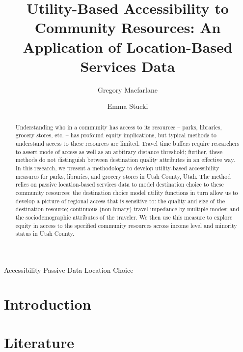 \documentclass[3p, authoryear]{elsarticle} %
\begin{document}
\begin{frontmatter}

  \title{Utility-Based Accessibility to Community Resources: An Application of Location-Based Services Data}
    \author[BYU]{Gregory Macfarlane}
    \author[BYU]{Emma Stucki}
      \address[BYU]{Brigham Young University Civil and Construction Engineering Department, 430 Engineering Building, Provo, Utah 84602}
    \address[Another University]{Some Other Place}
  
  \begin{abstract}
  Understanding who in a community has access to its resources -- parks, libraries, grocery stores, etc. -- has profound equity implications, but typical methods to understand access to these resources are limited. Travel time buffers require researchers to assert mode of access as well as an arbitrary distance threshold; further, these methods do not distinguish between destination quality attributes in an effective way. In this research, we present a methodology to develop utility-based accessibility measures for parks, libraries, and grocery stores in Utah County, Utah. The method relies on passive location-based services data to model destination choice to these community resources; the destination choice model utility functions in turn allow us to develop a picture of regional access that is sensitive to: the quality and size of the destination resource; continuous (non-binary) travel impedance by multiple modes; and the sociodemographic attributes of the traveler. We then use this measure to explore equity in access to the specified community resources across income level and minority status in Utah County.
  \end{abstract}
   \begin{keyword} Accessibility Passive Data Location Choice\end{keyword}
 \end{frontmatter}

\hypertarget{intro}{%
\section{Introduction}\label{intro}}

\hypertarget{lit-review}{%
\section{Literature}\label{lit-review}}
\end{document}
